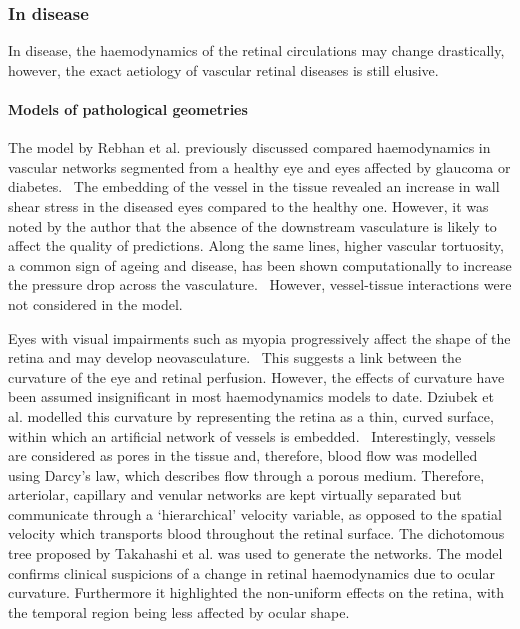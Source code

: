 \documentclass{article}
\begin{document}
\subsubsection*{In disease}

In disease, the haemodynamics of the retinal circulations may change drastically, however, the exact aetiology of vascular retinal diseases is still elusive.

\paragraph*{Models of pathological geometries}

The model by Rebhan et al. previously discussed compared haemodynamics in vascular networks segmented from a healthy eye and eyes affected by glaucoma or diabetes.~\cite{Rebhan_2019}
The embedding of the vessel in the tissue revealed an increase in wall shear stress in the diseased eyes compared to the healthy one.
However, it was noted by the author that the absence of the downstream vasculature is likely to affect the quality of predictions.\cite{Rebhan_2019}
Along the same lines, higher vascular tortuosity, a common sign of ageing and disease, has been shown computationally to increase the pressure drop across the vasculature.~\cite{Malek_2014}
However, vessel-tissue interactions were not considered in the model.

Eyes with visual impairments such as myopia progressively affect the shape of the retina and may develop neovasculature.~\cite{Medina_2016}
This suggests a link between the curvature of the eye and retinal perfusion.
However, the effects of curvature have been assumed insignificant in most haemodynamics models to date.
Dziubek et al. modelled this curvature by representing the retina as a thin, curved surface, within which an artificial network of vessels is embedded.~\cite{Dziubek_2015}
Interestingly, vessels are considered as pores in the tissue and, therefore, blood flow was modelled using Darcy's law, which describes flow through a porous medium.
Therefore, arteriolar, capillary and venular networks are kept virtually separated but communicate through a `hierarchical' velocity variable, as opposed to the spatial velocity which transports blood throughout the retinal surface.
The dichotomous tree proposed by Takahashi et al. was used to generate the networks.
The model confirms clinical suspicions of a change in retinal haemodynamics due to ocular curvature.
Furthermore it highlighted the non-uniform effects on the retina, with the temporal region being less affected by ocular shape.\cite{Dziubek_2015}
\end{document}
